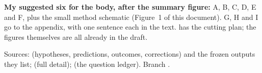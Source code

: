 \documentclass[11pt,a4paper]{article}
\begin{document}
\medskip
\textbf{My suggested six for the body, after the summary figure:} A, B, C, D, E and F, plus the small method schematic (Figure~1 of this document). G, H and I go to the appendix, with one sentence each in the text. 
has the cutting plan; the figures themselves are all already in the draft.



\medskip
{\footnotesize\color{gray}\raggedright Sources:  (hypotheses, predictions, outcomes, corrections)
and the frozen outputs they list;  (full detail);
 (the question ledger). Branch .\par}
\end{document}
